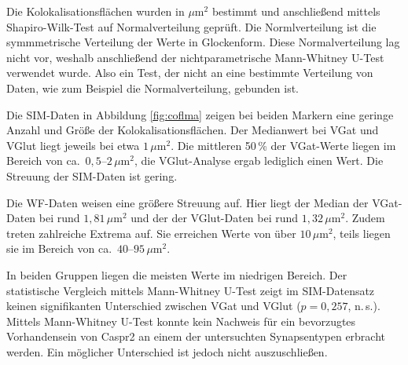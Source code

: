 Die Kolokalisationsflächen wurden in $\mu\text{m}^2$ bestimmt und anschließend mittels Shapiro-Wilk-Test auf Normalverteilung geprüft. Die Normlverteilung ist die symmmetrische Verteilung der Werte in Glockenform. Diese Normalverteilung lag nicht vor, weshalb anschließend der nichtparametrische Mann-Whitney U-Test verwendet wurde. Also ein Test, der nicht an eine bestimmte Verteilung von Daten, wie zum Beispiel die Normalverteilung, gebunden ist.

Die SIM-Daten in Abbildung \ref{fig:coflma} zeigen bei beiden Markern eine geringe Anzahl und
Größe der Kolokalisationsflächen. Der Medianwert bei VGat und VGlut liegt
jeweils bei etwa $1\,\mu\text{m}^2$. Die mittleren 50\,\% der VGat-Werte
liegen im Bereich von ca.\ $0{,}5$--$2\,\mu\text{m}^2$, die VGlut-Analyse
ergab lediglich einen Wert. Die Streuung der SIM-Daten ist gering.

Die WF-Daten weisen eine größere Streuung auf. Hier liegt der Median der VGat-Daten bei rund $1{,}81\,\mu\text{m}^2$ und der der VGlut-Daten bei rund $1{,}32\,\mu\text{m}^2$. Zudem treten zahlreiche Extrema auf. Sie
erreichen Werte von über $10\,\mu\text{m}^2$, teils liegen sie im Bereich
von ca.\ $40$--$95\,\mu\text{m}^2$.


In beiden Gruppen liegen die meisten Werte im niedrigen Bereich. Der
statistische Vergleich mittels Mann-Whitney U-Test zeigt
im SIM-Datensatz keinen signifikanten Unterschied zwischen VGat und VGlut
($p = 0{,}257$, n.\,s.). Mittels Mann-Whitney U-Test konnte kein Nachweis für ein bevorzugtes Vorhandensein von Caspr2 an einem der untersuchten Synapsentypen erbracht werden. Ein möglicher Unterschied ist jedoch nicht auszuschließen.


